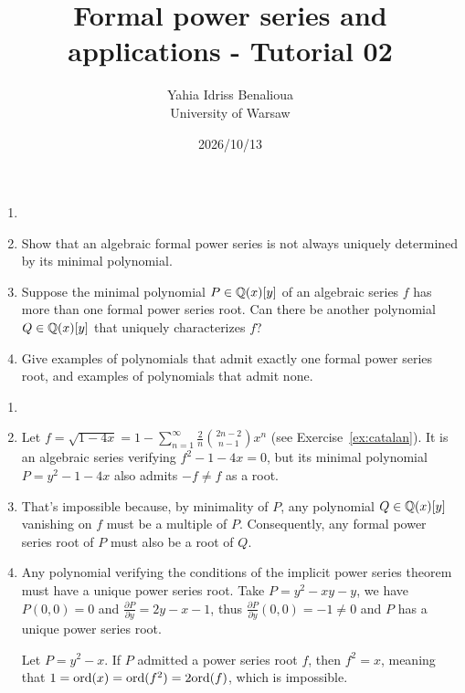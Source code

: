

\title{Formal power series and applications - Tutorial 02}
\date{2026/10/13}
\author{Yahia Idriss Benalioua \\ \small University of Warsaw}



\maketitle

\begin{exercise}
    \begin{enumerate}
        \item[]
        \item Show that an algebraic formal power series is not
            always uniquely determined by its minimal polynomial.
        \item Suppose the minimal polynomial $P \in
            \mathbb Q(x)[y]$ of an algebraic series $f$ has
            more than one formal power series root. Can there be
            another polynomial $Q \in  \mathbb Q(x)[y]$ that
            uniquely characterizes $f$?
        \item Give examples of polynomials that admit exactly one
            formal power series root, and examples of polynomials
            that admit none.
    \end{enumerate}
\end{exercise}
\begin{solution}
    \begin{enumerate}
        \item[]
        \item Let $f = \sqrt{1 - 4x} = 1 - \sum_{n=1}^{\infty} \frac{2}{n}
            \binom{2n-2}{n-1} x^n$ (see Exercise~\ref{ex:catalan}).
            It is an algebraic series verifying $f^2 - 1 - 4x = 0$,
            but its minimal polynomial $P = y^2 - 1 - 4x$ also admits
            $-f \neq f$ as a root.
        \item That's impossible because, by minimality of $P$, any
            polynomial $Q \in  \mathbb Q(x)[y]$ vanishing on
            $f$ must be a multiple of $P$.
            Consequently, any formal power series root of $P$ must
            also be a root of $Q$.
        \item Any polynomial verifying the conditions of the implicit
            power series theorem must have a unique power series root.
            Take \eg $P = y^2 - xy - y$, we have $P(0,0) = 0$ and
            $\frac{\partial P}{\partial y} = 2y - x - 1$, thus
            $\frac{\partial P}{\partial y} (0,0) = -1 \neq 0$ and $P$
            has a unique power series root.

            Let $P=y^2 - x$.
            If $P$ admitted a power series root $f$, then $f^2 = x$,
            meaning that $1 = \mathrm{ord}(x) = \mathrm{ord}(f^2) = 2 \mathrm{ord}(f)$, which
            is impossible.
    \end{enumerate}
\end{solution}

